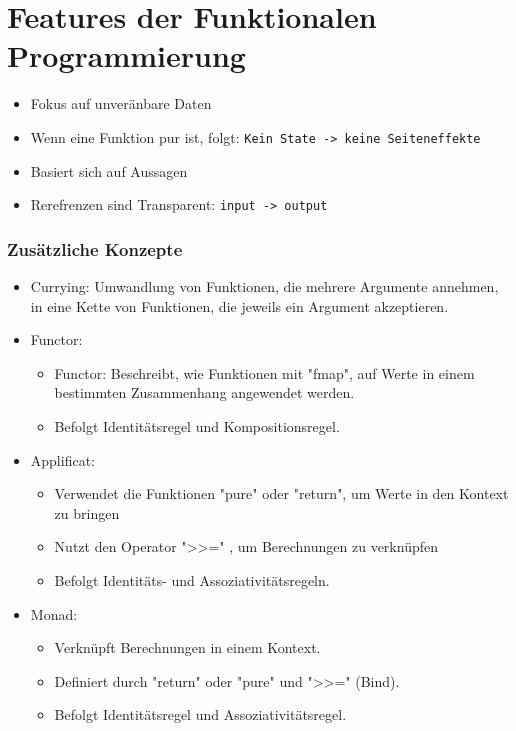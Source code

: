 \documentclass{beamer}
\def\code#1{\texttt{#1}}
\begin{document}
\section{Features der Funktionalen Programmierung}
\begin{frame}
	\begin{itemize}
		\item Fokus auf unveränbare Daten
            \item Wenn eine Funktion pur ist, folgt: \code{Kein State -> keine Seiteneffekte}
            \item Basiert sich auf Aussagen
            \item Rerefrenzen sind Transparent:   \code{input -> output}
	\end{itemize}
\end{frame}


\begin{frame}
\frametitle{Zusätzliche Konzepte }
	\begin{itemize}
			\item Currying: Umwandlung von Funktionen, die mehrere Argumente annehmen, in eine Kette von Funktionen, die jeweils ein Argument akzeptieren.
			\item Functor: \begin{itemize}
			    \item Functor: Beschreibt, wie Funktionen mit "fmap",  auf Werte in einem bestimmten Zusammenhang angewendet werden.
                    \item  Befolgt Identitätsregel und Kompositionsregel.
			\end{itemize}
                \item Applificat: \begin{itemize}
                    \item Verwendet die Funktionen   "pure" oder "return", um Werte in den Kontext zu bringen
                    \item Nutzt den Operator ">>=" , um Berechnungen zu verknüpfen
                    \item Befolgt Identitäts- und Assoziativitätsregeln.
                \end{itemize}
                \item Monad: \begin{itemize}
                    \item Verknüpft Berechnungen in einem Kontext.
                    \item Definiert durch "return" oder "pure" und ">>=" (Bind).
                    \item Befolgt Identitätsregel und Assoziativitätsregel.
                \end{itemize}
	\end{itemize}

\end{frame}
\end{document}
